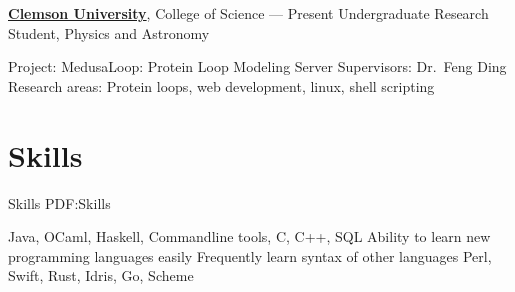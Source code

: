 \documentclass[letterpaper,10pt,oneside]{simpleresumecv}
\newcommand{\CVNote}{Resume compiled on {\today} for Apple}
\begin{document}
\begin{body}
\href{https://www.clemson.edu}
{\textbf{Clemson University}},
College of Science
\hfill
{} --- Present
\BulletItem%
Undergraduate Research Student, Physics and Astronomy
\begin{detail}
\SubBulletItem%
Project:
MedusaLoop: Protein Loop Modeling Server
\SubBulletItem%
Supervisors:
Dr.\ Feng Ding
\SubBulletItem%
Research areas:
Protein loops, web development, linux, shell scripting
\end{detail}
\GapNoBreak%


\section%
{Skills}
{Skills}
{PDF:Skills}

\BulletItem%
Java, OCaml, Haskell, Commandline tools, C, C++, SQL
\BulletItem%
Ability to learn new programming languages easily
\SubBulletItem%
Frequently learn syntax of other languages
\SubBulletItem%
Perl, Swift, Rust, Idris, Go, Scheme


\end{body}


\label{LastPage}~%
\end{document}
